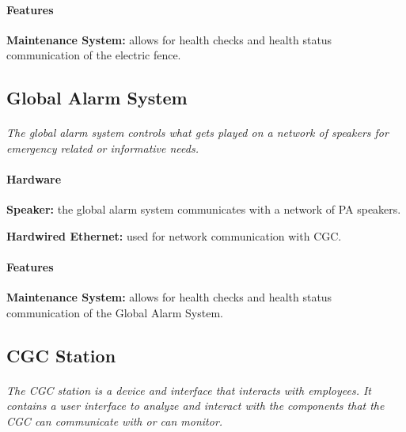 \documentclass[12pt]{article}
\begin{document}
	\paragraph{Features}
	\begin{list}{}{}
		\item \textbf{Maintenance System: }allows for health checks and health status
		 communication of the electric fence.
	\end{list}

	\subsection{Global Alarm System}
	\paragraph{} \textit{The global alarm system controls what gets played on a network 
	of speakers for emergency related or informative needs.}		

	\paragraph{Hardware}
	\begin{list}{}{}
		\item \textbf{Speaker: }the global alarm system communicates with a network of 
		PA speakers.
		\item \textbf{Hardwired Ethernet: }used for network communication with CGC. 
	\end{list}
	
	\paragraph{Features}
	\begin{list}{}{}
		\item \textbf{Maintenance System: }allows for health checks and health status
		 communication of the Global Alarm System.  
	\end{list}


	\subsection{CGC Station}
	\paragraph{} \textit{The CGC station is a device and interface that interacts with 
	employees. It contains a user interface to analyze and interact with the components 
	that the CGC can communicate with or can monitor. }		
	
\end{document}
